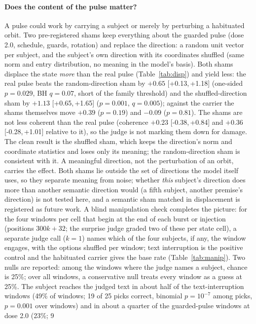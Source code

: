 \documentclass[11pt]{article}
\newcommand{\ci}[2]{[#1,\,#2]}
\begin{document}
\paragraph{Does the content of the pulse matter?} A pulse could work
by carrying a subject or merely by perturbing a habituated orbit. Two
pre-registered shams keep everything about the guarded pulse (dose
2.0, schedule, guards, rotation) and replace the direction: a random
unit vector per subject, and the subject's own direction with its
coordinates shuffled (same norm and entry distribution, no meaning in
the model's basis). Both shams displace the state \emph{more} than the
real pulse (Table~\ref{tab:disp}) and yield less: the real pulse
beats the random-direction sham by $+0.65$ \ci{+0.13}{+1.18}
(one-sided $p=0.029$, BH $q=0.07$, short of the family threshold)
and the shuffled-direction sham by $+1.13$ \ci{+0.65}{+1.65}
($p=0.001$, $q=0.005$); against the carrier the shams themselves move
$+0.39$ ($p=0.19$) and $-0.09$ ($p=0.81$).
The shams are not less coherent than the real pulse (coherence $+0.23$
\ci{-0.38}{+0.84} and $+0.36$ \ci{-0.28}{+1.01} relative to it), so the
judge is not marking them down for damage. The clean result is the
shuffled sham, which keeps the direction's norm and coordinate
statistics and loses only its meaning; the random-direction sham is
consistent with it. A meaningful direction, not the perturbation of an
orbit, carries the effect. Both shams lie outside the set of directions
the model itself uses, so they separate meaning from noise; whether
\emph{this} subject's direction does more than another semantic
direction would (a fifth subject, another premise's direction) is not
tested here, and a semantic sham matched in displacement is registered
as future work. A blind manipulation check completes the picture: for
the four windows per cell that begin at the end of each burst or
injection (positions $300k{+}32$; the surprise judge graded two of these
per state cell), a separate judge call ($k{=}1$) names which of the
four subjects, if any, the window engages, with the options shuffled
per window; text interruption is the positive control and the
habituated carrier gives the base rate (Table~\ref{tab:manip}). Two
nulls are reported: among the windows where the judge names a subject,
chance is 25\%; over all windows, a conservative null treats every
window as a guess at 25\%. The subject reaches the judged text in about
half of the text-interruption windows (49\% of windows; 19 of 25 picks
correct, binomial $p=10^{-7}$ among picks, $p=0.001$ over windows) and
in about a quarter of the guarded-pulse windows at dose 2.0 (23\%; 9
\end{document}
